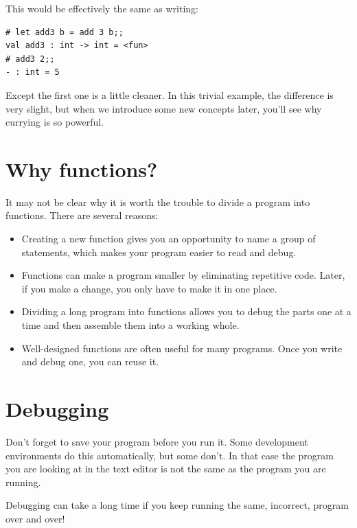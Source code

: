\documentclass[10pt]{book}
\begin{document}
This would be effectively the same as writing:

\beforeverb
\begin{verbatim}
# let add3 b = add 3 b;;
val add3 : int -> int = <fun>
# add3 2;;
- : int = 5
\end{verbatim}
\afterverb
%
Except the first one is a little cleaner. In this trivial example, the difference is
very slight, but when we introduce some new concepts later, you'll see why currying
is so powerful.

\section{Why functions?}

It may not be clear why it is worth the trouble to divide
a program into functions.  There are several reasons:

\begin{itemize}

\item Creating a new function gives you an opportunity to name a group
of statements, which makes your program easier to read and debug.

\item Functions can make a program smaller by eliminating repetitive
code.  Later, if you make a change, you only have
to make it in one place.

\item Dividing a long program into functions allows you to debug the
parts one at a time and then assemble them into a working whole.

\item Well-designed functions are often useful for many programs.
Once you write and debug one, you can reuse it.

\end{itemize}

\section{Debugging}
\label{editor}

Don't forget to save your program before you run it.  Some
development environments do this automatically, but some don't.
In that case the program you are looking at in the text editor
is not the same as the program you are running.

Debugging can take a long time if you keep running the same,
incorrect, program over and over!
\end{document}
